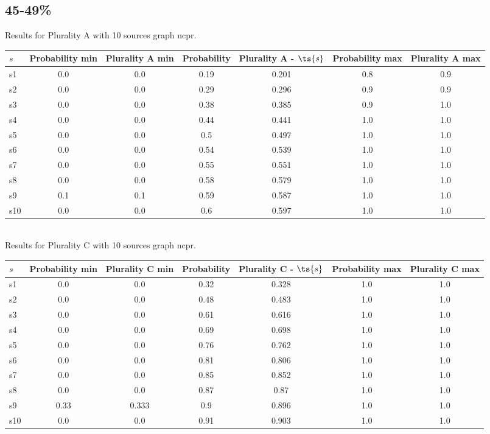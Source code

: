 \documentclass{article}
\begin{document}
\newpage

\subsection{45-49\%}

\noindent Results for Plurality A with 10 sources graph ncpr.

\noindent\begin{tabular}{|l|c|c|c|c|c|c|}
\hline
$s$& Probability min & Plurality A min & Probability & Plurality A - $\ts{s}$ & Probability max & Plurality A max\\
\hline
s1 &0.0 & 0.0 & 0.19 & 0.201 & 0.8 & 0.9\\
\hline
s2 &0.0 & 0.0 & 0.29 & 0.296 & 0.9 & 0.9\\
\hline
s3 &0.0 & 0.0 & 0.38 & 0.385 & 0.9 & 1.0\\
\hline
s4 &0.0 & 0.0 & 0.44 & 0.441 & 1.0 & 1.0\\
\hline
s5 &0.0 & 0.0 & 0.5 & 0.497 & 1.0 & 1.0\\
\hline
s6 &0.0 & 0.0 & 0.54 & 0.539 & 1.0 & 1.0\\
\hline
s7 &0.0 & 0.0 & 0.55 & 0.551 & 1.0 & 1.0\\
\hline
s8 &0.0 & 0.0 & 0.58 & 0.579 & 1.0 & 1.0\\
\hline
s9 &0.1 & 0.1 & 0.59 & 0.587 & 1.0 & 1.0\\
\hline
s10 &0.0 & 0.0 & 0.6 & 0.597 & 1.0 & 1.0\\
\hline
\end{tabular}\\

\noindent Results for Plurality C with 10 sources graph ncpr.

\noindent\begin{tabular}{|l|c|c|c|c|c|c|}
\hline
$s$& Probability min & Plurality C min & Probability & Plurality C - $\ts{s}$ & Probability max & Plurality C max\\
\hline
s1 &0.0 & 0.0 & 0.32 & 0.328 & 1.0 & 1.0\\
\hline
s2 &0.0 & 0.0 & 0.48 & 0.483 & 1.0 & 1.0\\
\hline
s3 &0.0 & 0.0 & 0.61 & 0.616 & 1.0 & 1.0\\
\hline
s4 &0.0 & 0.0 & 0.69 & 0.698 & 1.0 & 1.0\\
\hline
s5 &0.0 & 0.0 & 0.76 & 0.762 & 1.0 & 1.0\\
\hline
s6 &0.0 & 0.0 & 0.81 & 0.806 & 1.0 & 1.0\\
\hline
s7 &0.0 & 0.0 & 0.85 & 0.852 & 1.0 & 1.0\\
\hline
s8 &0.0 & 0.0 & 0.87 & 0.87 & 1.0 & 1.0\\
\hline
s9 &0.33 & 0.333 & 0.9 & 0.896 & 1.0 & 1.0\\
\hline
s10 &0.0 & 0.0 & 0.91 & 0.903 & 1.0 & 1.0\\
\hline
\end{tabular}\\
\end{document}
